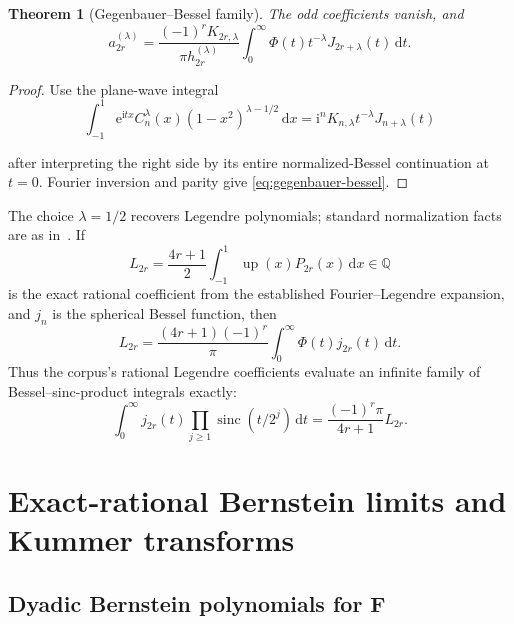 \documentclass[11pt,oneside]{article}
\newtheorem{theorem}{Theorem}[section]
\theoremstyle{definition}
\theoremstyle{remark}
\newcommand{\Q}{\mathbb Q}
\newcommand{\Up}{\operatorname{up}}
\newcommand{\sinc}{\operatorname{sinc}}
\newcommand{\dd}{\,\mathrm d}
\newcommand{\ii}{\mathrm i}
\newcommand{\e}{\mathrm e}
\newcommand{\1}{\mathbf 1}
\begin{document}
\begin{theorem}[Gegenbauer--Bessel family]
\label{thm:gegenbauer-bessel}
The odd coefficients vanish, and
\begin{equation}
 \boxed{\displaystyle
 a_{2r}^{(\lambda)}=
 \frac{(-1)^rK_{2r,\lambda}}{\pi h_{2r}^{(\lambda)}}
 \int_0^\infty
 \Phi(t)t^{-\lambda}J_{2r+\lambda}(t)\dd t.}            \label{eq:gegenbauer-bessel}
\end{equation}
\end{theorem}

\begin{proof}
Use the plane-wave integral
\[
 \int_{-1}^{1}\e^{\ii tx}C_n^\lambda(x)
 (1-x^2)^{\lambda-1/2}\dd x
 =\ii^nK_{n,\lambda}t^{-\lambda}J_{n+\lambda}(t)
\]

after interpreting the right side by its entire normalized-Bessel
continuation at $t=0$.  Fourier inversion and parity give
\eqref{eq:gegenbauer-bessel}.
\end{proof}

The choice $\lambda=1/2$ recovers Legendre polynomials; standard normalization facts are as in~\cite{szego1975}.  If
\begin{equation}
 L_{2r}=\frac{4r+1}{2}\int_{-1}^{1}\Up(x)P_{2r}(x)\dd x \in\Q          \label{eq:legendre-coeff}
\end{equation}
is the exact rational coefficient from the established Fourier--Legendre
expansion, and $j_n$ is the spherical Bessel function, then
\begin{equation}
 \boxed{\displaystyle
 L_{2r}=\frac{(4r+1)(-1)^r}{\pi}
 \int_0^\infty\Phi(t)j_{2r}(t)\dd t.}                   \label{eq:legendre-bessel}
\end{equation}
Thus the corpus's rational Legendre coefficients evaluate an infinite family
of Bessel--sinc-product integrals exactly:
\begin{equation}
 \int_0^\infty j_{2r}(t)
 \prod_{j\ge1}\sinc(t/2^j)\dd t
 =\frac{(-1)^r\pi}{4r+1}L_{2r}.                         \label{eq:rational-bessel-integrals}
\end{equation}

\section{Exact-rational Bernstein limits and Kummer transforms}
\label{sec:bernstein}

\subsection{Dyadic Bernstein polynomials for F}
\end{document}
